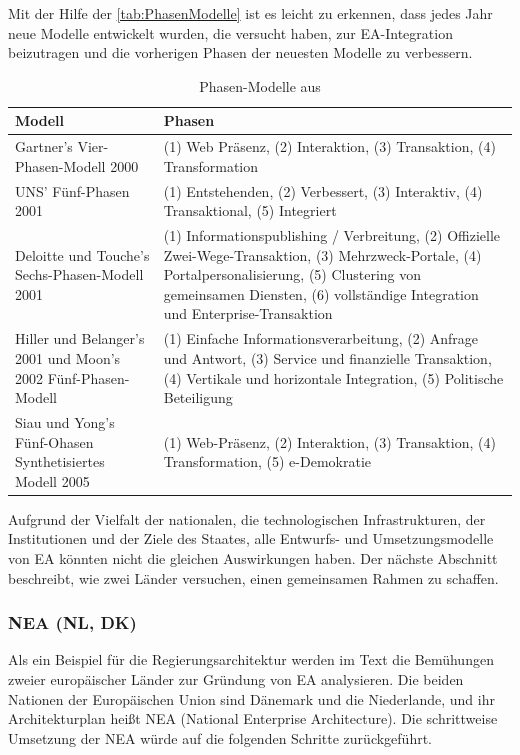 \documentclass[
	doc,
	a4paper,
	helv
	]{apa6}
\begin{document}
Mit der Hilfe der \autoref{tab:PhasenModelle} ist es leicht zu erkennen, dass jedes Jahr neue Modelle entwickelt wurden, die versucht haben, zur EA-Integration beizutragen und die vorherigen Phasen der neuesten Modelle zu verbessern.

\begin{table}[!htbp]
\caption{Phasen-Modelle aus \textcite{Napitupulu2016}}
\begin{center}
\begin{tabularx}{\textwidth}{|X|X|}
\hline
Modell & Phasen \\\hline
Gartner's Vier-Phasen-Modell 2000
&
(1) Web Präsenz,
(2) Interaktion,
(3) Transaktion,
(4) Transformation
\\\hline
UNS' Fünf-Phasen 2001
&
(1) Entstehenden,
(2) Verbessert,
(3) Interaktiv,
(4) Transaktional,
(5) Integriert
\\\hline
Deloitte und Touche's Sechs-Phasen-Modell 2001
&
(1) Informationspublishing / Verbreitung,
(2) Offizielle Zwei-Wege-Transaktion,
(3) Mehrzweck-Portale,
(4) Portalpersonalisierung,
(5) Clustering von gemeinsamen Diensten,
(6) vollständige Integration und Enterprise-Transaktion
\\\hline
Hiller und Belanger's 2001 und Moon's 2002 Fünf-Phasen-Modell
&
(1) Einfache Informationsverarbeitung,
(2) Anfrage und Antwort,
(3) Service und finanzielle Transaktion,
(4) Vertikale und horizontale Integration,
(5) Politische Beteiligung
\\\hline
Siau und Yong's Fünf-Ohasen Synthetisiertes Modell 2005
&
(1) Web-Präsenz,
(2) Interaktion,
(3) Transaktion,
(4) Transformation,
(5) e-Demokratie
\\\hline
\end{tabularx}
\end{center}
\label{tab:PhasenModelle}
\end{table}

Aufgrund der Vielfalt der nationalen, die technologischen Infrastrukturen, der Institutionen und der Ziele des Staates, alle Entwurfs- und Umsetzungsmodelle von EA könnten nicht die gleichen Auswirkungen haben. Der nächste Abschnitt beschreibt, wie zwei Länder versuchen, einen gemeinsamen Rahmen zu schaffen.

\subsubsection{NEA (NL, DK)}
Als ein Beispiel für die Regierungsarchitektur werden im Text die Bemühungen zweier europäischer Länder zur Gründung von EA analysieren. \autocite{Janssen2007} Die beiden Nationen der Europäischen Union sind Dänemark und die Niederlande, und ihr Architekturplan heißt NEA (National Enterprise Architecture). Die schrittweise Umsetzung der NEA würde auf die folgenden Schritte zurückgeführt.
\end{document}
